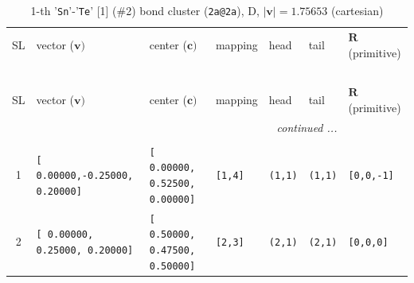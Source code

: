 \documentclass[fleqn,10pt,landscape]{jsarticle}
\begin{document}
\begin{longtable}[l]{cllllll}
\captionsetup{justification=raggedright, singlelinecheck=off}
\caption{1-th '\texttt{Sn}'-'\texttt{Te}' [1] (\#2) bond cluster (\texttt{2a@2a}), D, $|\bm{v}|=1.75653$ (cartesian)}
 \\
 \hline \hline
SL & vector ($\bm{v})$ & center ($\bm{c})$ & mapping & head & tail & $\bm{R}$ (primitive) \\ \hline \endfirsthead

\multicolumn{6}{l}{\tablename\ \thetable{}} \\
 \hline \hline
SL & vector ($\bm{v})$ & center ($\bm{c})$ & mapping & head & tail & $\bm{R}$ (primitive) \\ \hline \endhead

 \hline \hline
\multicolumn{6}{r}{\footnotesize\it continued ...} \\ \endfoot

 \hline \hline
\multicolumn{6}{r}{} \\ \endlastfoot

1 & \texttt{[ 0.00000,-0.25000, 0.20000]} & \texttt{[ 0.00000, 0.52500, 0.00000]} & \texttt{[1,4]} & \texttt{(1,1)} & \texttt{(1,1)} & \texttt{[0,0,-1]} \\ \hline
2 & \texttt{[ 0.00000, 0.25000, 0.20000]} & \texttt{[ 0.50000, 0.47500, 0.50000]} & \texttt{[2,3]} & \texttt{(2,1)} & \texttt{(2,1)} & \texttt{[0,0,0]} \\
\end{longtable}
\renewcommand{\arraystretch}{1.6}
\end{document}
